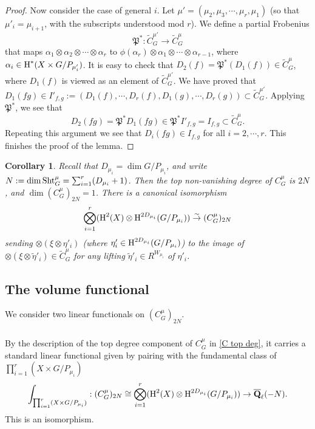 \documentclass[reqno]{amsart}
\numberwithin{equation}{subsection}
\newtheorem{cor}[subsubsection]{Corollary}
\theoremstyle{definition}
\newcommand\frP{\mathfrak{P}}
\newcommand\Sht{\textup{Sht}}
\newcommand{\Qlbar}{\overline{\Q}_\ell}
\newcommand{\wt}[1]{\widetilde{#1}}
\newcommand\ot{\otimes}
\newcommand{\cohog}[2]{\textup{H}^{#1}({#2})}     %
\newcommand{\isom}{\stackrel{\sim}{\to}}
\renewcommand\a\alpha
\newcommand{\y}{\eta}
\newcommand{\Q}{\mathbf{Q}}
\begin{document}
\begin{proof}
    Now consider the case of general $i$. Let $\mu'=(\mu_2,\mu_3,\cdots, \mu_r,\mu_1)$ (so that $\mu'_i=\mu_{i+1}$, with the subscripts understood mod $r$). We define a partial Frobenius
    \begin{equation}\label{partial Frob on C}
        \frP^*: \wt C^{\mu'}_G\to \wt C^{\mu}_G
    \end{equation}
    that maps $\a_1\ot\a_2\ot\cdots\ot \a_r$ to $\phi(\a_r)\ot\a_1\ot\cdots\ot \a_{r-1}$, where $\a_i\in \cohog{*}{X\times G/P_{\mu'_{i}}}$. It is easy to check that $D_2(f)=\frP^*(D_1(f))\in \wt C^\mu_G$, where $D_1(f)$ is viewed as an element of $\wt C^{\mu'}_G$. We have proved that $D_1(fg)\in I'_{f,g}:=(D_1(f),\cdots, D_r(f), D_1(g),\cdots, D_r(g))\subset \wt C^{\mu'}_G$. Applying $\frP^*$, we see that
    \begin{equation*}
        D_2(fg)=\frP^*D_1(fg)\in \frP^* I'_{f,g}=I_{f,g}\subset \wt C^\mu_G.
    \end{equation*}
    Repeating this argument we see that $D_i(fg)\in I_{f,g}$ for all $i=2,\cdots, r$. This finishes the proof of the lemma.
\end{proof}

\begin{cor}\label{c:taut ring top deg} Recall that $D_{\mu_i}=\dim G/P_{\mu_i}$, and write $N:=\dim \Sht^\mu_G=\sum_{i=1}^r(D_{\mu_i}+1)$. Then the top non-vanishing degree of $C^\mu_G$ is $2N$, and $\dim(C^\mu_G)_{2N}=1$. There is a canonical isomorphism
\begin{equation}\label{C top deg}
    \bigotimes_{i=1}^r(\cohog{2}{X}\ot \cohog{2D_{\mu_i}}{G/P_{\mu_i}})\isom (C^\mu_G)_{2N}
\end{equation}
sending $\ot(\xi\ot \y'_i)$ (where $\y'_i\in \cohog{2D_{\mu_i}}{G/P_{\mu_i}}$) to the image of $\ot(\xi\ot \wt\y'_i)\in \wt C^\mu_G$ for any lifting $\wt\y'_i\in R^{W_{\mu_i}}$ of $\y'_i$.
\end{cor}


\subsection{The volume functional}\label{sss:vol functional}
We consider two linear functionals on $(C^\mu_G)_{2N}$.
\subsubsection{} By the description of the top degree component of $C^\mu_G$ in \eqref{C top deg}, it carries a standard linear functional given by pairing with the fundamental class of $\prod_{i=1}^r (X\times G/P_{\mu_i})$
\begin{equation*}
   \int_{\prod_{i=1}^r (X\times G/P_{\mu_i})}: (C^\mu_G)_{2N}\cong \bigotimes_{i=1}^r(\cohog{2}{X}\ot \cohog{2D_{\mu_i}}{G/P_{\mu_i}})\to \Qlbar(-N).
\end{equation*}
This is an isomorphism.
\end{document}
